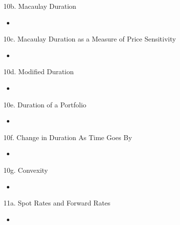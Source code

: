 \begin{CHPT_SUMM_AUTO}[label = {L.-10b}]{10b. Macaulay Duration}
	\begin{itemize}
		\item	
	\end{itemize}
\end{CHPT_SUMM_AUTO}

\begin{CHPT_SUMM_AUTO}[label = {L.-10c}]{10c. Macaulay Duration as a Measure of Price Sensitivity}
	\begin{itemize}
		\item	
	\end{itemize}
\end{CHPT_SUMM_AUTO}

\begin{CHPT_SUMM_AUTO}[label = {L.-10d}]{10d. Modified Duration}
	\begin{itemize}
		\item	
	\end{itemize}
\end{CHPT_SUMM_AUTO}

\begin{CHPT_SUMM_AUTO}[label = {L.-10e}]{10e. Duration of a Portfolio}
	\begin{itemize}
		\item	
	\end{itemize}
\end{CHPT_SUMM_AUTO}

\begin{CHPT_SUMM_AUTO}[label = {L.-10f}]{10f. Change in Duration As Time Goes By}
	\begin{itemize}
		\item	
	\end{itemize}
\end{CHPT_SUMM_AUTO}

\begin{CHPT_SUMM_AUTO}[label = {L.-10g}]{10g. Convexity}
	\begin{itemize}
		\item	
	\end{itemize}
\end{CHPT_SUMM_AUTO}

\begin{CHPT_SUMM_AUTO}[label = {L.-11a}]{11a. Spot Rates and Forward Rates}
	\begin{itemize}
		\item	
	\end{itemize}
\end{CHPT_SUMM_AUTO}

